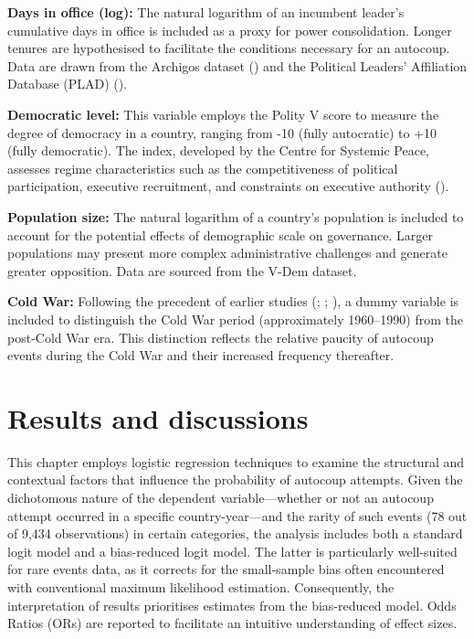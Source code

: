 \documentclass[
  12pt,
]{report}
\begin{document}
\textbf{Days in office (log):} The natural logarithm of an incumbent
leader's cumulative days in office is included as a proxy for power
consolidation. Longer tenures are hypothesised to facilitate the
conditions necessary for an autocoup. Data are drawn from the Archigos
dataset () and the Political Leaders' Affiliation Database (PLAD)
().

\textbf{Democratic level:} This variable employs the Polity V score to
measure the degree of democracy in a country, ranging from -10 (fully
autocratic) to +10 (fully democratic). The index, developed by the
Centre for Systemic Peace, assesses regime characteristics such as the
competitiveness of political participation, executive recruitment, and
constraints on executive authority ().

\textbf{Population size:} The natural logarithm of a country's
population is included to account for the potential effects of
demographic scale on governance. Larger populations may present more
complex administrative challenges and generate greater opposition. Data
are sourced from the V-Dem dataset.

\textbf{Cold War:} Following the precedent of earlier studies
(;
;
), a dummy variable is
included to distinguish the Cold War period (approximately 1960--1990)
from the post-Cold War era. This distinction reflects the relative
paucity of autocoup events during the Cold War and their increased
frequency thereafter.

\section{Results and discussions}\label{results-and-discussions}

This chapter employs logistic regression techniques to examine the
structural and contextual factors that influence the probability of
autocoup attempts. Given the dichotomous nature of the dependent
variable---whether or not an autocoup attempt occurred in a specific
country-year---and the rarity of such events (78 out of 9,434
observations) in certain categories, the analysis includes both a
standard logit model and a bias-reduced logit model. The latter is
particularly well-suited for rare events data, as it corrects for the
small-sample bias often encountered with conventional maximum likelihood
estimation. Consequently, the interpretation of results prioritises
estimates from the bias-reduced model. Odds Ratios (ORs) are reported to
facilitate an intuitive understanding of effect sizes.
\end{document}

